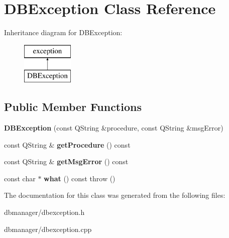 \hypertarget{class_d_b_exception}{\section{D\-B\-Exception Class Reference}
\label{class_d_b_exception}
}
Inheritance diagram for D\-B\-Exception\-:\begin{figure}[H]
\begin{center}
\leavevmode
\includegraphics[height=2.000000cm]{class_d_b_exception}
\end{center}
\end{figure}
\subsection*{Public Member Functions}
\begin{DoxyCompactItemize}
\item 
\hypertarget{class_d_b_exception_aeefcb555e1bdfe6248245a73a0ddf6d1}{{\bfseries D\-B\-Exception} (const Q\-String \&procedure, const Q\-String \&msg\-Error)}\label{class_d_b_exception_aeefcb555e1bdfe6248245a73a0ddf6d1}

\item 
\hypertarget{class_d_b_exception_ab50142afc74ccecd60a70e6753eb0288}{const Q\-String \& {\bfseries get\-Procedure} () const }\label{class_d_b_exception_ab50142afc74ccecd60a70e6753eb0288}

\item 
\hypertarget{class_d_b_exception_a8adb89067e413626f6c04e7f502e8413}{const Q\-String \& {\bfseries get\-Msg\-Error} () const }\label{class_d_b_exception_a8adb89067e413626f6c04e7f502e8413}

\item 
\hypertarget{class_d_b_exception_aae255b2c0afc2d6b0bf0e8bb1b774967}{const char $\ast$ {\bfseries what} () const   throw ()}\label{class_d_b_exception_aae255b2c0afc2d6b0bf0e8bb1b774967}

\end{DoxyCompactItemize}


The documentation for this class was generated from the following files\-:\begin{DoxyCompactItemize}
\item 
dbmanager/dbexception.\-h\item 
dbmanager/dbexception.\-cpp\end{DoxyCompactItemize}

